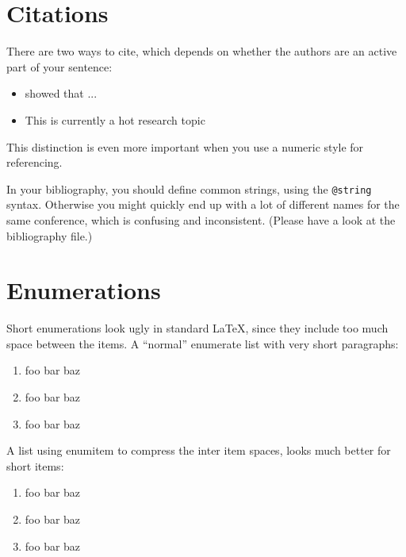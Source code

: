 \documentclass[12pt, %
a4paper, %
twoside, %
openright, %
abstract=on, %
DIV=11,      %
BCOR=8mm]{scrbook} %
\begin{document}
    \section{Citations}
    There are two ways to cite, which depends on whether the authors are an
    active part of your sentence:
    \begin{itemize}
        \item \citet{muster} showed that ...
        \item This is currently a hot research topic \citep{muster}
    \end{itemize}
    This distinction  is even more important  when you use a  numeric style
    for referencing.

    In  your bibliography,  you should  define common  strings, using  the 
    \verb|@string| syntax.  Otherwise you might  quickly end up with a lot 
    of different  names for  the same conference,  which is  confusing and 
    inconsistent.  (Please have a look at the bibliography file.)          

    \section{Enumerations}

    Short enumerations look ugly in  standard \LaTeX{}, since they include 
    too much  space between the  items.  A ``normal'' enumerate  list with 
    very short paragraphs:                                                 
    \begin{enumerate}
        \item foo bar baz
        \item foo bar baz
        \item foo bar baz
    \end{enumerate}

    A list using enumitem to compress the inter item spaces, looks much better for short items:
    \begin{enumerate}[noitemsep]
        \item foo bar baz
        \item foo bar baz
        \item foo bar baz
    \end{enumerate}
\end{document}
